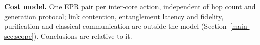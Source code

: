 \documentclass[journal]{IEEEtran}
\newcommand{\mainScope}{Section~\ref{main-sec:scope}}
\begin{document}
\textbf{Cost model.} One EPR pair per inter-core action, independent of
hop count and generation protocol; link contention, entanglement latency
and fidelity, purification and classical communication are outside the
model (\mainScope{}). Conclusions are relative to it.




\end{document}
